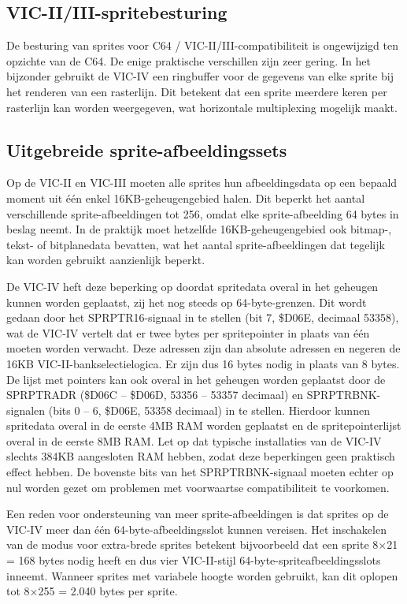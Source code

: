 \subsection{VIC-II/III-spritebesturing}

De besturing van sprites voor C64 / VIC-II/III-compatibiliteit is ongewijzigd ten opzichte van de C64. De enige praktische verschillen zijn zeer gering. In het bijzonder gebruikt de VIC-IV een ringbuffer voor de gegevens van elke sprite bij het renderen van een rasterlijn. Dit betekent dat een sprite meerdere keren per rasterlijn kan worden weergegeven, wat horizontale multiplexing mogelijk maakt.

\subsection{Uitgebreide sprite-afbeeldingssets}

Op de VIC-II en VIC-III moeten alle sprites hun afbeeldingsdata op een bepaald moment uit één enkel 16KB-geheugengebied halen. Dit beperkt het aantal verschillende sprite-afbeeldingen tot 256, omdat elke sprite-afbeelding 64 bytes in beslag neemt. In de praktijk moet hetzelfde 16KB-geheugengebied ook bitmap-, tekst- of bitplanedata bevatten, wat het aantal sprite-afbeeldingen dat tegelijk kan worden gebruikt aanzienlijk beperkt.

De VIC-IV heft deze beperking op doordat spritedata overal in het geheugen kunnen worden geplaatst, zij het nog steeds op 64-byte-grenzen. Dit wordt gedaan door het SPRPTR16-signaal in te stellen (bit 7, \$D06E, decimaal 53358), wat de VIC-IV vertelt dat er twee bytes per spritepointer in plaats van één moeten worden verwacht. Deze adressen zijn dan absolute adressen en negeren de 16KB VIC-II-bankselectielogica. Er zijn dus 16 bytes nodig in plaats van 8 bytes. De lijst met pointers kan ook overal in het geheugen worden geplaatst door de SPRPTRADR (\$D06C -- \$D06D, 53356 -- 53357 decimaal) en SPRPTRBNK-signalen (bits 0 -- 6, \$D06E, 53358 decimaal) in te stellen. Hierdoor kunnen spritedata overal in de eerste 4MB RAM worden geplaatst en de spritepointerlijst overal in de eerste 8MB RAM. Let op dat typische installaties van de VIC-IV slechts 384KB aangesloten RAM hebben, zodat deze beperkingen geen praktisch effect hebben. De bovenste bits van het SPRPTRBNK-signaal moeten echter op nul worden gezet om problemen met voorwaartse compatibiliteit te voorkomen.

Een reden voor ondersteuning van meer sprite-afbeeldingen is dat sprites op de VIC-IV meer dan één 64-byte-afbeeldingsslot kunnen vereisen. Het inschakelen van de modus voor extra-brede sprites betekent bijvoorbeeld dat een sprite 8$\times$21 = 168 bytes nodig heeft en dus vier VIC-II-stijl 64-byte-spriteafbeeldingsslots inneemt. Wanneer sprites met variabele hoogte worden gebruikt, kan dit oplopen tot 8$\times$255 = 2.040 bytes per sprite.

